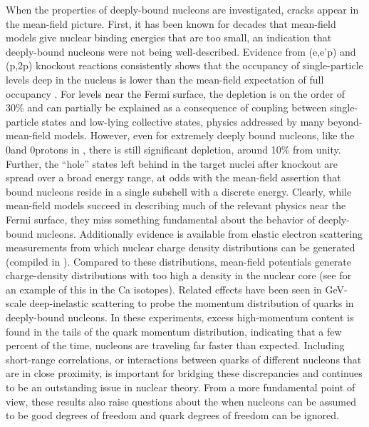 When the properties of deeply-bound nucleons are investigated, cracks appear in the mean-field
picture. First, it has been known for decades that mean-field models give nuclear binding energies
that are too small, an indication that deeply-bound nucleons were not being well-described. Evidence
from (e,e'p) and (p,2p) knockout reactions 
consistently shows that the occupancy of single-particle levels deep in the nucleus is lower
than the mean-field expectation of full occupancy \cite{Mougey1980, Jacob1966, Jacob1973}.
For levels near the Fermi surface, the depletion is on the order of 30\% and can partially be
explained as a consequence of coupling between single-particle states and low-lying collective
states, physics addressed by many beyond-mean-field models. However, even for extremely deeply bound
nucleons, like the 0\sOne and 0\pThree protons in \pbEight, there is still significant depletion,
around 10\% from unity. Further, the ``hole'' states left behind in the target nuclei after knockout are
spread over a broad energy range, at odds with the mean-field assertion that bound nucleons
reside in a single subshell with a discrete energy. Clearly, while mean-field models succeed in
describing much of the relevant physics near the Fermi surface, they miss something fundamental
about the behavior of deeply-bound nucleons. 
Additionally evidence is available from elastic electron scattering measurements from which nuclear
charge density distributions can be generated (compiled in \cite{DeVries1987}). Compared to these
distributions, mean-field potentials generate charge-density distributions with too high a density
in the nuclear core (see \cite{Brown1979} for an example of this in the Ca isotopes).
Related effects have been seen in GeV-scale deep-inelastic scattering to probe the momentum
distribution of quarks in deeply-bound nucleons. In these experiments, excess high-momentum
content is found in the tails of the quark momentum distribution, indicating that a few percent of the time, 
nucleons are traveling far faster than expected. Including short-range
correlations, or interactions between quarks of different nucleons that are in close proximity,
is important for bridging these discrepancies and continues to be an outstanding issue in nuclear 
theory. From a more fundamental point of view, these results also raise questions about the when nucleons
can be assumed to be good degrees of freedom and quark degrees of freedom can be ignored.

